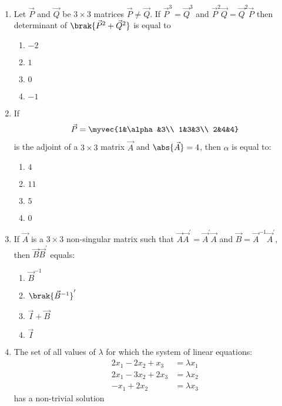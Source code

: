 \begin{enumerate}
	\item Let $\vec{P}$ and $\vec{Q}$ be $3\times3$ matrices $\vec{P}\neq \vec{Q}$. If $\vec{P}^3=\vec{Q}^3$ and $\vec{P}^2\vec{Q}=\vec{Q}^2\vec{P}$ then determinant of $\brak{\vec{P}^2+\vec{Q}^2}$ is equal to
	\hfill{}
        \begin{enumerate}
                \item $-2$
                \item $1$
                \item $0$
                \item $-1$
        \end{enumerate}

	\item If \begin{align*}
		\vec{P} = \myvec{1&\alpha&3\\
		1&3&3\\
		2&4&4}
	\end{align*} is the adjoint of a $3\times3$ matrix $\vec{A}$ and $\abs{\vec{A}} = 4$, then $\alpha$ is equal to:
	\hfill{}
        \begin{enumerate}
                \item $4$
                \item $11$
                \item $5$
                \item $0$
        \end{enumerate}



	\item If $\vec{A}$ is a $3\times3$ non-singular matrix such that $\vec{A}\vec{A}^{\prime}=\vec{A}^{\prime}\vec{A}$ and $\vec{B}=\vec{A}^{-1}\vec{A}^{\prime}$, then $\vec{B}\vec{B}^{\prime}$ equals:
	\hfill {}{\par}
	\begin{enumerate}
	    	\item $\vec{B}^{-1}$
		\item $\brak{\vec{B}^{-1}}^{\prime}$
		\item $\vec{I}+\vec{B}$ 
		\item $\vec{I}$
        \end{enumerate}


    \item The set of all values of $\lambda$ for which the system of linear equations:
	\begin{align*}
		2x_1-2x_2+x_3 &= \lambda x_1\\
		2x_1-3x_2+2x_3 &= \lambda x_2\\
		-x_1+2x_2 &= \lambda x_3
	\end{align*}
	has a non-trivial solution


\end{enumerate}
